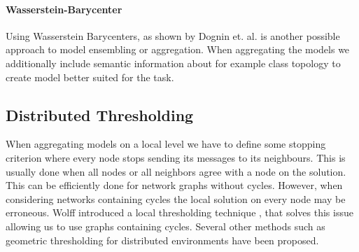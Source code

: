     \paragraph{Wasserstein-Barycenter}
      Using Wasserstein Barycenters, as shown by Dognin et. al. \cite{dognin2019wasserstein} is another possible approach to model ensembling or aggregation. When aggregating the models we additionally include semantic information about for example class topology to create model better suited for the task.
   

    \subsection{Distributed Thresholding} 
    When aggregating models on a local level we have to define some stopping criterion where every node stops sending its messages to its neighbours.
    This is usually done when all nodes or all neighbors agree with a node on the solution.
    This can be efficiently done for network graphs without cycles.
    However, when considering networks containing cycles the local solution on every node may be erroneous.
    Wolff introduced a local thresholding technique  \cite{wolff2013local}, that solves this issue allowing us to use graphs containing cycles.
    Several other methods such as geometric thresholding \cite{sharfman2007geometric} \cite{keren2011shape} for distributed environments have been proposed.


    

